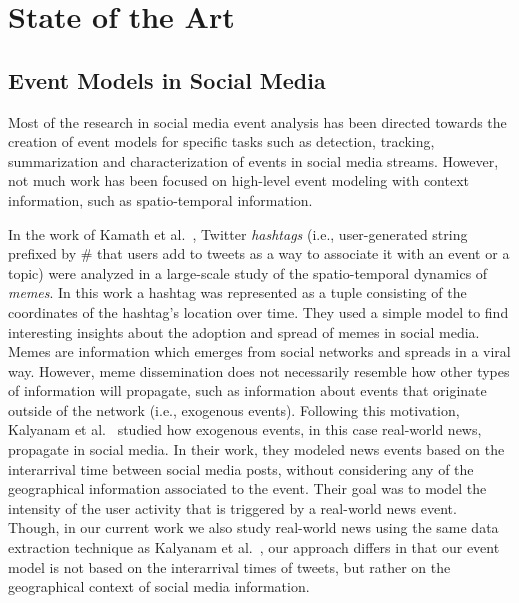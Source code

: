 \chapter{State of the Art}


\section{Event Models in Social Media}

Most of the research in social media event analysis has been directed towards
the creation of event models for specific tasks such as detection, tracking, summarization
and characterization of events in social media streams. However, not much work has
been focused on high-level event modeling with context information, such as
spatio-temporal information.


In the work of Kamath et al.~\cite{Kamath:Spatio-temporal:2013}, Twitter
\emph{hashtags} (i.e., user-generated
string prefixed by \# that users add to tweets as a way to
associate it with an event or a topic) were analyzed
in a large-scale study of the spatio-temporal
dynamics of {\em memes}. In this work a hashtag was represented
as a tuple consisting of the coordinates of the hashtag's location over time.
They used a simple model to find interesting insights about
the adoption and spread of memes in social media. Memes are information which
emerges from social networks and spreads in a viral way. However, meme
dissemination does not necessarily resemble how other types of information
will propagate, such as information about events that originate outside of the network (i.e., exogenous
events). Following this motivation, Kalyanam et al.~\cite{10.1371/journal.pone.0166694}
studied how exogenous events, in this case real-world news, propagate in social media.
In their work, they modeled news events based on the interarrival time between
social media posts, without considering any of the geographical information
associated to the event. Their goal was to model the intensity of the user activity
that is triggered by a real-world news event. Though, in our current work we also study real-world news using the
same data extraction technique as Kalyanam et al.~\cite{10.1371/journal.pone.0166694},
our approach differs in that our event model is not based on the interarrival
times of tweets, but rather on the geographical context of social
media information.

